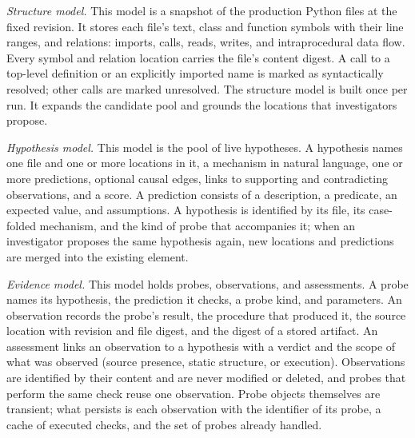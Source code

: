 \documentclass[letterpaper,journal]{IEEEtran}
\begin{document}
\emph{Structure model.} This model is a snapshot of the production Python files at the fixed revision. It stores each file's text, class and function symbols with their line ranges, and relations: imports, calls, reads, writes, and intraprocedural data flow. Every symbol and relation location carries the file's content digest. A call to a top-level definition or an explicitly imported name is marked as syntactically resolved; other calls are marked unresolved. The structure model is built once per run. It expands the candidate pool and grounds the locations that investigators propose.

\emph{Hypothesis model.} This model is the pool of live hypotheses. A hypothesis names one file and one or more locations in it, a mechanism in natural language, one or more predictions, optional causal edges, links to supporting and contradicting observations, and a score. A prediction consists of a description, a predicate, an expected value, and assumptions. A hypothesis is identified by its file, its case-folded mechanism, and the kind of probe that accompanies it; when an investigator proposes the same hypothesis again, new locations and predictions are merged into the existing element.

\emph{Evidence model.} This model holds probes, observations, and assessments. A probe names its hypothesis, the prediction it checks, a probe kind, and parameters. An observation records the probe's result, the procedure that produced it, the source location with revision and file digest, and the digest of a stored artifact. An assessment links an observation to a hypothesis with a verdict and the scope of what was observed (source presence, static structure, or execution). Observations are identified by their content and are never modified or deleted, and probes that perform the same check reuse one observation. Probe objects themselves are transient; what persists is each observation with the identifier of its probe, a cache of executed checks, and the set of probes already handled.
\end{document}
